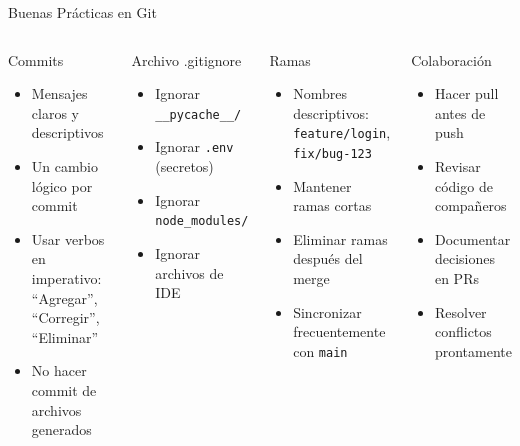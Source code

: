 \documentclass[aspectratio=169]{beamer}
\begin{document}
\begin{frame}{Buenas Prácticas en Git}
    \begin{columns}[t]
        \begin{block}{Commits}
            \begin{itemize}
                \item Mensajes claros y descriptivos
                \item Un cambio lógico por commit
                \item Usar verbos en imperativo: ``Agregar'', ``Corregir'', ``Eliminar''
                \item No hacer commit de archivos generados
            \end{itemize}
        \end{block}
        
        \begin{block}{Archivo .gitignore}
            \begin{itemize}
                \item Ignorar \texttt{\_\_pycache\_\_/}
                \item Ignorar \texttt{.env} (secretos)
                \item Ignorar \texttt{node\_modules/}
                \item Ignorar archivos de IDE
            \end{itemize}
        \end{block}
        
        \begin{block}{Ramas}
            \begin{itemize}
                \item Nombres descriptivos: \texttt{feature/login}, \texttt{fix/bug-123}
                \item Mantener ramas cortas
                \item Eliminar ramas después del merge
                \item Sincronizar frecuentemente con \texttt{main}
            \end{itemize}
        \end{block}
        
        \begin{block}{Colaboración}
            \begin{itemize}
                \item Hacer pull antes de push
                \item Revisar código de compañeros
                \item Documentar decisiones en PRs
                \item Resolver conflictos prontamente
            \end{itemize}
        \end{block}
    \end{columns}
\end{frame}
\end{document}
